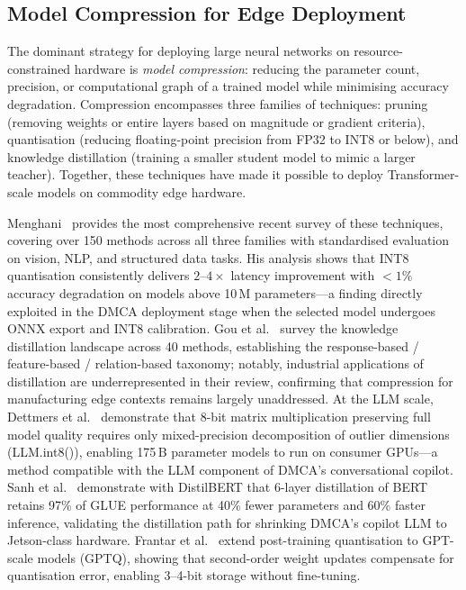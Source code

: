 \subsection{Model Compression for Edge Deployment}
\label{subsec:compression}

The dominant strategy for deploying large neural networks on
resource-constrained hardware is \emph{model compression}:
reducing the parameter count, precision, or computational graph
of a trained model while minimising accuracy degradation.
Compression encompasses three families of techniques:
pruning (removing weights or entire layers based on
magnitude or gradient criteria),
quantisation (reducing floating-point precision from FP32 to INT8
or below), and
knowledge distillation (training a smaller student model to
mimic a larger teacher).
Together, these techniques have made it possible to deploy
Transformer-scale models on commodity edge hardware.

Menghani~\cite{menghani2023efficient} provides the most
comprehensive recent survey of these techniques, covering
over 150 methods across all three families with standardised
evaluation on vision, NLP, and structured data tasks.
His analysis shows that INT8 quantisation consistently delivers
$2\text{--}4\times$ latency improvement with ${<}1\%$ accuracy
degradation on models above 10\,M parameters—a finding directly
exploited in the DMCA deployment stage when the selected model
undergoes ONNX export and INT8 calibration.
Gou et al.~\cite{gou2021distillation} survey the knowledge
distillation landscape across 40 methods, establishing the
response-based / feature-based / relation-based taxonomy;
notably, industrial applications of distillation are
underrepresented in their review, confirming that compression
for manufacturing edge contexts remains largely unaddressed.
At the LLM scale, Dettmers et al.~\cite{dettmers2022llmint8}
demonstrate that 8-bit matrix multiplication preserving
full model quality requires only mixed-precision decomposition
of outlier dimensions (LLM.int8()), enabling 175\,B parameter
models to run on consumer GPUs—a method compatible with the LLM
component of DMCA's conversational copilot.
Sanh et al.~\cite{sanh2019distilbert} demonstrate with
DistilBERT that 6-layer distillation of BERT retains 97\% of
GLUE performance at 40\% fewer parameters and 60\% faster
inference, validating the distillation path for shrinking
DMCA's copilot LLM to Jetson-class hardware.
Frantar et al.~\cite{frantar2023gptq} extend post-training
quantisation to GPT-scale models (GPTQ), showing that second-order
weight updates compensate for quantisation error, enabling
3–4-bit storage without fine-tuning.

